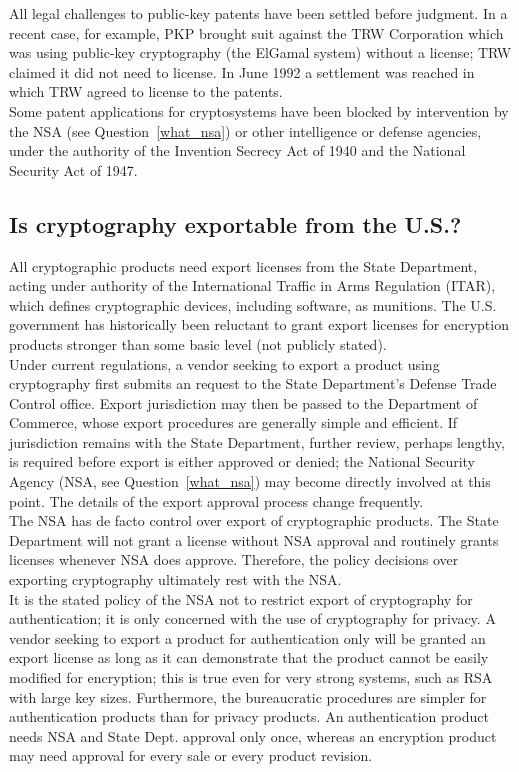 All legal challenges to public-key patents have been settled before
judgment. In a recent case, for example, PKP brought suit against the
TRW Corporation which was using public-key cryptography (the ElGamal
system) without a license; TRW claimed it did not need to license. In
June 1992 a settlement was reached in which TRW agreed to license to
the patents.\\

Some patent applications for cryptosystems have been blocked by
intervention by the NSA (see Question~\ref{what_nsa}) or other intelligence
or defense agencies, under the authority of the Invention Secrecy Act of
1940 and the National Security Act of 1947.

\subsection{Is cryptography exportable from the U.S.?}
\label{cryp_expor}

All cryptographic products need export licenses from the State
Department, acting under authority of the International Traffic in Arms
Regulation (ITAR), which defines cryptographic devices, including
software, as munitions. The U.S. government has historically been
reluctant to grant export licenses for encryption products stronger
than some basic level (not publicly stated).\\

Under current regulations, a vendor seeking to export a product using
cryptography first submits an request to the State Department's Defense
Trade Control office. Export jurisdiction may then be passed to the
Department of Commerce, whose export procedures are generally simple and
efficient. If jurisdiction remains with the State Department, further
review, perhaps lengthy, is required before export is either approved or
denied; the National Security Agency (NSA, see Question~\ref{what_nsa}) may
become directly involved at this point. The details of the export approval
process change frequently.\\

The NSA has de facto control over export of cryptographic products. The
State Department will not grant a license without NSA approval and
routinely grants licenses whenever NSA does approve. Therefore, the
policy decisions over exporting cryptography ultimately rest with the
NSA.\\

It is the stated policy of the NSA not to restrict export of
cryptography for authentication; it is only concerned with the use of
cryptography for privacy. A vendor seeking to export a product for
authentication only will be granted an export license as long as it can
demonstrate that the product cannot be easily modified for encryption;
this is true even for very strong systems, such as RSA with large key
sizes. Furthermore, the bureaucratic procedures are simpler for
authentication products than for privacy products. An authentication
product needs NSA and State Dept. approval only once, whereas an
encryption product may need approval for every sale or every product
revision.\\

